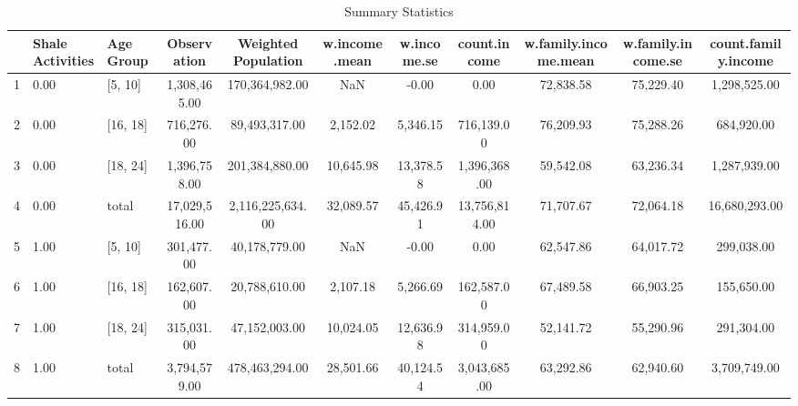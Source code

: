 \begin{table}
\centering
\begin{tabular}{lllcccccccc}
  \hline
 & Shale Activities & Age Group & Observation & Weighted Population & w.income.mean & w.income.se & count.income & w.family.income.mean & w.family.income.se & count.family.income \\ 
  \hline
1 & 0.00 & [5, 10] & 1,308,465.00 & 170,364,982.00 & NaN & -0.00 & 0.00 & 72,838.58 & 75,229.40 & 1,298,525.00 \\ 
  2 & 0.00 & [16, 18] & 716,276.00 & 89,493,317.00 & 2,152.02 & 5,346.15 & 716,139.00 & 76,209.93 & 75,288.26 & 684,920.00 \\ 
  3 & 0.00 & [18, 24] & 1,396,758.00 & 201,384,880.00 & 10,645.98 & 13,378.58 & 1,396,368.00 & 59,542.08 & 63,236.34 & 1,287,939.00 \\ 
  4 & 0.00 & total & 17,029,516.00 & 2,116,225,634.00 & 32,089.57 & 45,426.91 & 13,756,814.00 & 71,707.67 & 72,064.18 & 16,680,293.00 \\ 
  5 & 1.00 & [5, 10] & 301,477.00 & 40,178,779.00 & NaN & -0.00 & 0.00 & 62,547.86 & 64,017.72 & 299,038.00 \\ 
  6 & 1.00 & [16, 18] & 162,607.00 & 20,788,610.00 & 2,107.18 & 5,266.69 & 162,587.00 & 67,489.58 & 66,903.25 & 155,650.00 \\ 
  7 & 1.00 & [18, 24] & 315,031.00 & 47,152,003.00 & 10,024.05 & 12,636.98 & 314,959.00 & 52,141.72 & 55,290.96 & 291,304.00 \\ 
  8 & 1.00 & total & 3,794,579.00 & 478,463,294.00 & 28,501.66 & 40,124.54 & 3,043,685.00 & 63,292.86 & 62,940.60 & 3,709,749.00 \\ 
   \hline
\end{tabular}
\caption{Summary Statistics} 
\label{tab:sum_stat}
\end{table}
